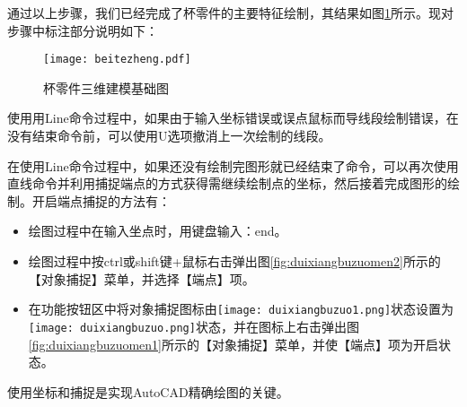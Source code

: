 通过以上步骤，我们已经完成了杯零件的主要特征绘制，其结果如图\ref{fig:bettezheng}所示。现对步骤中标注部分说明如下：
\noindent
\begin{figure}[htbp]
\centering
\texttt{[image: beitezheng.pdf]}
\caption{杯零件三维建模基础图}\label{fig:bettezheng}
\end{figure}

\begin{tips}
\item 使用用Line命令过程中，如果由于输入坐标错误或误点鼠标而导线段绘制错误，在没有结束命令前，可以使用U选项撤消上一次绘制的线段。
\item 在使用Line命令过程中，如果还没有绘制完图形就已经结束了命令，可以再次使用直线命令并利用捕捉端点的方式获得需继续绘制点的坐标，然后接着完成图形的绘制。开启端点捕捉的方法有：
\begin{itemize}
\item 绘图过程中在输入坐点时，用键盘输入：end。
\item 绘图过程中按ctrl或shift键+鼠标右击弹出图\ref{fig:duixiangbuzuomen2}所示的【对象捕捉】菜单，并选择【端点】项。
\item 在功能按钮区中将对象捕捉图标由\texttt{[image: duixiangbuzuo1.png]}状态设置为\texttt{[image: duixiangbuzuo.png]}状态，并在图标上右击弹出图\ref{fig:duixiangbuzuomen1}所示的【对象捕捉】菜单，并使【端点】项为开启状态。
\end{itemize}
\item 使用坐标和捕捉是实现AutoCAD精确绘图的关键。
\end{tips}
\begin{figure}[htbp]
\centering
\begin{floatrow}
\end{floatrow}
\end{figure}

